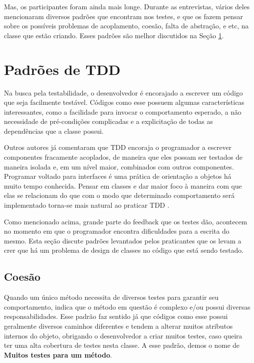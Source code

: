 Mas, os participantes foram ainda mais longe. Durante as entrevistas,
vários deles mencionaram diversos padrões que encontram nos testes,
e que os fazem pensar sobre os possíveis problemas de acoplamento,
coesão, falta de abstração, e etc, na classe que estão criando.
Esses padrões são melhor discutidos na Seção \ref{padroes-tdd}.


\section{Padrões de TDD}
\label{padroes-tdd}

Na busca pela testabilidade, o desenvolvedor é encorajado a escrever um
código que seja facilmente testável. Códigos como esse possuem algumas
características interessantes, como a facilidade para invocar o comportamento
esperado, a não necessidade de pré-condições complicadas e a explicitação de
todas as dependências que a classe possui.

Outros autores já comentaram que 
TDD encoraja o programador a escrever componentes fracamente acoplados, de
maneira que eles possam ser testados de maneira isolada e, em um nível maior,
combinados com outros componentes.
Programar voltado para interfaces é uma prática de orientação a objetos há muito
tempo conhecida. Pensar em classes e dar maior foco à maneira com que
elas se relacionam do que com o modo que determinado comportamento será implementado
torna-se mais natural ao praticar TDD \cite{GOOS}. 

Como mencionado acima, grande parte do feedback que os testes
dão, acontecem no momento em que o programador encontra dificuldades para a
escrita do mesmo. Esta seção discute padrões levantados pelos praticantes
que os levam a crer que há um problema de design de classes no código
que está sendo testado.

\subsection{Coesão}

Quando um único método necessita de diversos testes para garantir seu comportamento,
indica que o método em questão é complexo e/ou possui diversas responsabilidades.
Esse padrão faz sentido já que códigos como esse possui geralmente diversos caminhos
diferentes e tendem a alterar muitos atributos internos do objeto, obrigando o desenvolvedor
a criar muitos testes, caso queira ter uma alta cobertura de testes nesta classe.
A esse padrão, demos o nome de \textbf{Muitos testes para um método}.


